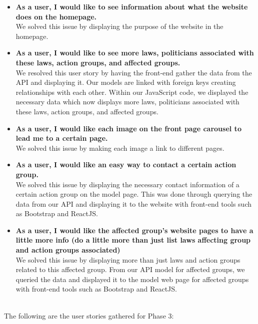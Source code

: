 \documentclass[12pt]{article}
\begin{document}
\begin{itemize}
	\item\textbf{As a user, I would like to see information about what the website does on the homepage.} \\
	We solved this issue by displaying the purpose of the website in the homepage.
	\\
	
	\item\textbf{As a user, I would like to see more laws, politicians associated with these laws, action groups, and affected groups.} \\
	We resolved this user story by having the front-end gather the data from the API and displaying it. Our models are linked with foreign keys creating relationships with each other. Within our JavaScript code, we displayed the necessary data which now displays more laws, politicians associated with these laws, action groups, and affected groups.
	\\
	
	\item\textbf{As a user, I would like each image on the front page carousel to lead me to a certain page.} \\
	We solved this issue by making each image a link to different pages.
	\\
	
	\item\textbf{As a user, I would like an easy way to contact a certain action group.} \\
	We solved this issue by displaying the necessary contact information of a certain action group on the model page. This was done through querying the data from our API and displaying it to the website with front-end tools such as Bootstrap and ReactJS.
	\\ 
	
	\item\textbf{As a user, I would like the affected group's website pages to have a little more info (do a little more than just list laws affecting group and action groups associated)} \\
	We solved this issue by displaying more than just laws and action groups related to this affected group. From our API model for affected groups, we queried the data and displayed it to the model web page for affected groups with front-end tools such as Bootstrap and ReactJS.
\end{itemize}~\\
The following are the user stories gathered for Phase 3:  \vspace{0.5em}
	
\end{document}
